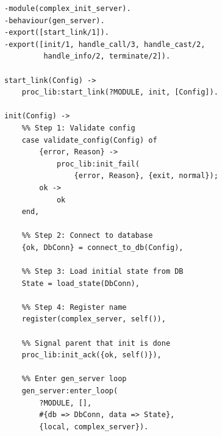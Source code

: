 \documentclass[a4paper,11pt]{article}
\begin{document}
\begin{lstlisting}[style=erlangstyle, caption={使用 enter\_loop 的复杂初始化}]
-module(complex_init_server).
-behaviour(gen_server).
-export([start_link/1]).
-export([init/1, handle_call/3, handle_cast/2,
         handle_info/2, terminate/2]).

start_link(Config) ->
    proc_lib:start_link(?MODULE, init, [Config]).

init(Config) ->
    %% Step 1: Validate config
    case validate_config(Config) of
        {error, Reason} ->
            proc_lib:init_fail(
                {error, Reason}, {exit, normal});
        ok ->
            ok
    end,

    %% Step 2: Connect to database
    {ok, DbConn} = connect_to_db(Config),

    %% Step 3: Load initial state from DB
    State = load_state(DbConn),

    %% Step 4: Register name
    register(complex_server, self()),

    %% Signal parent that init is done
    proc_lib:init_ack({ok, self()}),

    %% Enter gen_server loop
    gen_server:enter_loop(
        ?MODULE, [],
        #{db => DbConn, data => State},
        {local, complex_server}).
\end{lstlisting}
\end{document}
